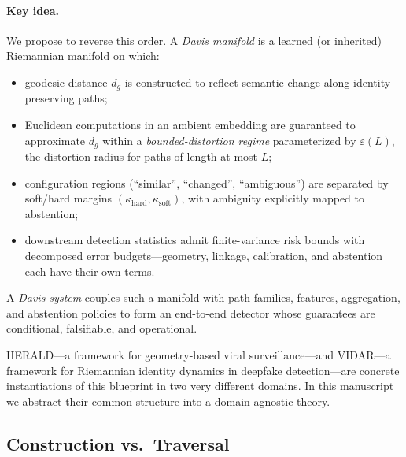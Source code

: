 \documentclass[11pt]{article}
\begin{document}
\paragraph{Key idea.}
We propose to reverse this order. A \emph{Davis manifold} is a learned (or inherited) Riemannian manifold on which:
\begin{itemize}[leftmargin=*]
    \item geodesic distance $d_g$ is constructed to reflect semantic change along identity-preserving paths;
    \item Euclidean computations in an ambient embedding are guaranteed to approximate $d_g$ within a \emph{bounded-distortion regime} parameterized by $\varepsilon(L)$, the distortion radius for paths of length at most $L$;
    \item configuration regions (``similar'', ``changed'', ``ambiguous'') are separated by soft/hard margins $(\kappa_{\text{hard}}, \kappa_{\text{soft}})$, with ambiguity explicitly mapped to abstention;
    \item downstream detection statistics admit finite-variance risk bounds with decomposed error budgets---geometry, linkage, calibration, and abstention each have their own terms.
\end{itemize}
A \emph{Davis system} couples such a manifold with path families, features, aggregation, and abstention policies to form an end-to-end detector whose guarantees are conditional, falsifiable, and operational.

HERALD---a framework for geometry-based viral surveillance---and VIDAR---a framework for Riemannian identity dynamics in deepfake detection---are concrete instantiations of this blueprint in two very different domains.  In this manuscript we abstract their common structure into a domain-agnostic theory.

\subsection{Construction vs.\ Traversal}
\label{sec:construction-vs-traversal}
\end{document}
